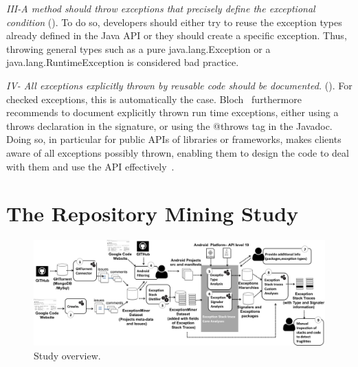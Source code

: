 \emph{III-A method should throw exceptions that precisely define the
exceptional condition} (\cite{gosling2000java,bloch2008effective}). To do so,
developers should either try to reuse the exception types already defined in the
Java API or they should create a specific exception. Thus, throwing general types such as a
pure java.lang.Exception or a java.lang.RuntimeException is considered bad practice.


\emph{IV- All exceptions explicitly thrown by reusable code should be documented.}
(\cite{mandrioli1992advances,gosling2000java,wirfs2006toward,bloch2008effective}).
For checked exceptions, this is automatically the case.
Bloch~\cite{bloch2008effective} furthermore recommends to document explicitly thrown
run time exceptions, either using a throws declaration in the signature, or using
the @throws tag in the Javadoc.
Doing so, in particular for public APIs of libraries or frameworks,
makes clients aware of all exceptions possibly thrown,
enabling them to design the code to deal with them and use the API effectively~\cite{Robil00,wirfs2006toward}.


\section{The Repository Mining Study}
\label{sec:study}

\begin{figure}
\centering \includegraphics[width=1\hsize]{overview_review.png}
\caption{Study overview.}\label{fig:overview}
\end{figure}


